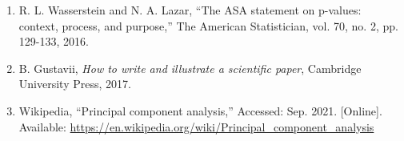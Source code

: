 \documentclass[12pt]{article}
\begin{document}
\begin{enumerate}
    \item R. L. Wasserstein and N. A. Lazar, “The ASA statement on p-values: context, process, and purpose,” The American Statistician, vol. 70, no. 2, pp. 129-133, 2016.
    \item B. Gustavii, \textit{How to write and illustrate a scientific paper}, Cambridge University Press, 2017.
    \item Wikipedia, “Principal component analysis,” Accessed: Sep. 2021. [Online]. Available: \url{https://en.wikipedia.org/wiki/Principal_component_analysis}
\end{enumerate}
\end{document}
